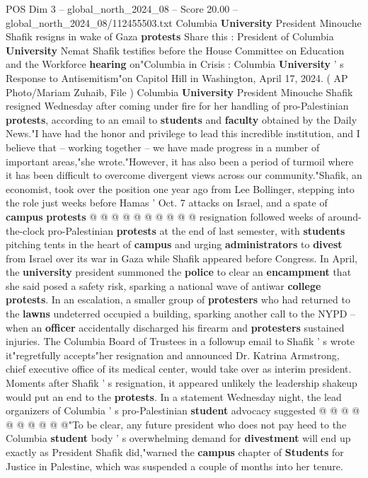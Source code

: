 \begin{textsample}{POS Dim 3 – global\_north\_2024\_08 – Score 20.00 – global\_north\_2024\_08/112455503.txt}  \label{ex:f3_pos_143}
Columbia \textbf{University} President Minouche Shafik resigns in wake of Gaza \textbf{protests} Share this : President of Columbia \textbf{University} Nemat Shafik testifies before the House Committee on Education and the Workforce \textbf{hearing} on"Columbia in Crisis : Columbia \textbf{University} ' s Response to Antisemitism"on Capitol Hill in Washington, April 17, 2024. ( AP Photo/Mariam Zuhaib, File ) Columbia \textbf{University} President Minouche Shafik resigned Wednesday after coming under fire for her handling of pro-Palestinian \textbf{protests}, according to an email to \textbf{students} and \textbf{faculty} obtained by the Daily News."I have had the honor and privilege to lead this incredible institution, and I believe that -- working together -- we have made progress in a number of important areas,"she wrote."However, it has also been a period of turmoil where it has been difficult to overcome divergent views across our community."Shafik, an economist, took over the position one year ago from Lee Bollinger, stepping into the role just weeks before Hamas ' Oct. 7 attacks on Israel, and a spate of \textbf{campus} \textbf{protests} @ @ @ @ @ @ @ @ @ @ resignation followed weeks of around-the-clock pro-Palestinian \textbf{protests} at the end of last semester, with \textbf{students} pitching tents in the heart of \textbf{campus} and urging \textbf{administrators} to \textbf{divest} from Israel over its war in Gaza while Shafik appeared before Congress.
In April, the \textbf{university} president summoned the \textbf{police} to clear an \textbf{encampment} that she said posed a safety risk, sparking a national wave of antiwar \textbf{college} \textbf{protests}.
In an escalation, a smaller group of \textbf{protesters} who had returned to the \textbf{lawns} undeterred occupied a building, sparking another call to the NYPD -- when an \textbf{officer} accidentally discharged his firearm and \textbf{protesters} sustained injuries.
The Columbia Board of Trustees in a followup email to Shafik ' s wrote it"regretfully accepts"her resignation and announced Dr.
Katrina Armstrong, chief executive office of its medical center, would take over as interim president.
Moments after Shafik ' s resignation, it appeared unlikely the leadership shakeup would put an end to the \textbf{protests}.
In a statement Wednesday night, the lead organizers of Columbia ' s pro-Palestinian \textbf{student} advocacy suggested @ @ @ @ @ @ @ @ @ @"To be clear, any future president who does not pay heed to the Columbia \textbf{student} body ' s overwhelming demand for \textbf{divestment} will end up exactly as President Shafik did,"warned the \textbf{campus} chapter of \textbf{Students} for Justice in Palestine, which was suspended a couple of months into her tenure.

\end{textsample}
